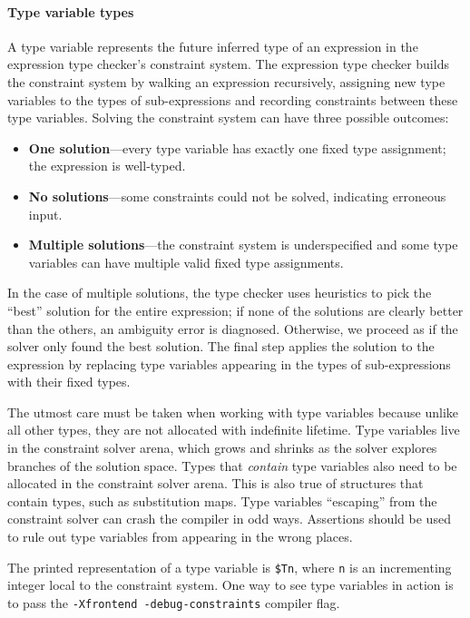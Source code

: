 \documentclass[../generics]{subfiles}
\begin{document}
\paragraph{Type variable types}
A type variable represents the future inferred type of an expression in the expression type checker's constraint system. The expression type checker builds the constraint system by walking an expression recursively, assigning new type variables to the types of sub-expressions and recording constraints between these type variables. Solving the constraint system can have three possible outcomes:
\begin{itemize}
\item \textbf{One solution}---every type variable has exactly one fixed type assignment; the expression is well-typed.
\item \textbf{No solutions}---some constraints could not be solved, indicating erroneous input.
\item \textbf{Multiple solutions}---the constraint system is underspecified and some type variables can have multiple valid fixed type assignments.
\end{itemize}

In the case of multiple solutions, the type checker uses heuristics to pick the ``best'' solution for the entire expression; if none of the solutions are clearly better than the others, an ambiguity error is diagnosed. Otherwise, we proceed as if the solver only found the best solution. The final step applies the solution to the expression by replacing type variables appearing in the types of sub-expressions with their fixed types.

The utmost care must be taken when working with type variables because unlike all other types, they are not allocated with indefinite lifetime. Type variables live in the constraint solver arena, which grows and shrinks as the solver explores branches of the solution space. Types that \emph{contain} type variables also need to be allocated in the constraint solver arena. This is also true of structures that contain types, such as substitution maps. Type variables ``escaping'' from the constraint solver can crash the compiler in odd ways. Assertions should be used to rule out type variables from appearing in the wrong places.

The printed representation of a type variable is \texttt{\$Tn}, where \texttt{n} is an incrementing integer local to the constraint system. One way to see type variables in action is to pass the \texttt{-Xfrontend~-debug-constraints} compiler flag.
\end{document}
